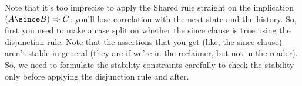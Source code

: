 % 
% 
% 
% 
% 
% 
% 
% 
% 
% 
% 

Note that it's too imprecise to apply the Shared rule straight on the
implication $(A \since B) \Rightarrow C$: you'll lose correlation with the next
state and the history. So, first you need to make a case split on whether the
since clause is true using the disjunction rule. Note that the assertions that
you get (like, the since clause) aren't stable in general (they are if we're in
the reclaimer, but not in the reader). So, we need to formulate the stability
constraints carefully to check the stability only before applying the
disjunction rule and after.



